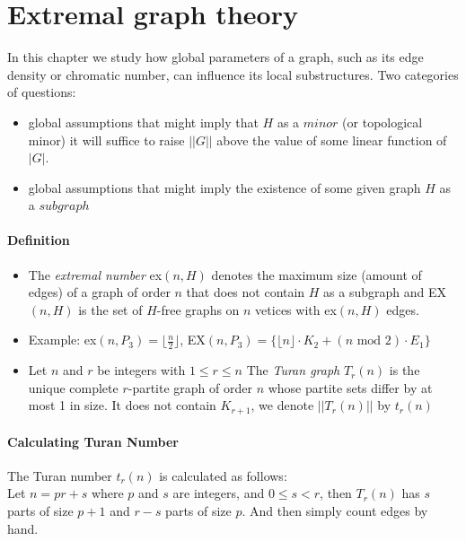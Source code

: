 \section{Extremal graph theory}
In this chapter we study how global parameters of a graph, such as its edge density 
or chromatic number, can influence its local substructures.
Two categories of questions:
\begin{itemize}
    \item global assumptions that might imply that $ H $ as a $minor$ (or topological minor)
    it will suffice to raise $ ||G|| $ above the value of some linear function 
    of $|G|$.
    \item global assumptions that might imply the existence of some given graph $ H $ 
    as  a $subgraph$ 
\end{itemize}

\paragraph{Definition} 
\begin{itemize}
    \item The \textit{extremal number} ex$(n,H)$ denotes the maximum
        size (amount of edges) of a graph of order $ n $ that does not contain
        $ H $ as a subgraph and EX$(n,H)$ is the set of $H$-free graphs on $n$
        vetices with ex$(n,H)$ edges.
    \item Example: ex$(n,P_3) = \lfloor\frac{n}{2}\rfloor$, EX$(n,P_3)
    = \{\lfloor n\rfloor \cdot K_2 + (n \text{ mod } 2) \cdot E_1\} $
    \item Let $ n $ and $ r $ be integers with $ 1 \leq r \leq n $ The 
    \textit{Turan graph} $T_r(n)$ is the unique complete $r$-partite graph of order 
    $n$ whose partite sets differ by at most 1 in size. It does not contain 
    $K_{r+1}$, we denote $||T_r(n)||$ by $t_r(n)$
\end{itemize}

\paragraph{Calculating Turan Number} $ $\\
The Turan number $t_r(n)$ is calculated as follows:\\
Let $n = pr + s$ where $ p $ and $ s $ are integers, and 
$ 0 \leq s < r $, then $ T_r(n) $ has $ s $ parts of size $p + 1$
and $r - s$ parts of size $ p$. And then simply count edges by hand.

